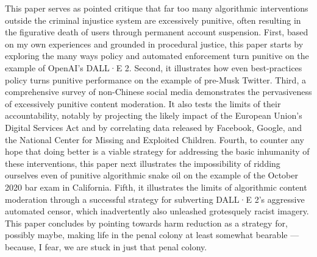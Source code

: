 This paper serves as pointed critique that far too many algorithmic interventions outside the criminal injustice system are excessively punitive, often resulting in the figurative death of users through permanent account suspension. First, based on my own experiences and grounded in procedural justice, this paper starts by exploring the many ways policy and automated enforcement turn punitive on the example of OpenAI's DALL·E 2. Second, it illustrates how even best-practices policy turns punitive performance on the example of pre-Musk Twitter. Third, a comprehensive survey of non-Chinese social media demonstrates the pervasiveness of excessively punitive content moderation. It also tests the limits of their accountability, notably by projecting the likely impact of the European Union's Digital Services Act and by correlating data released by Facebook, Google, and the National Center for Missing and Exploited Children. Fourth, to counter any hope that doing better is a viable strategy for addressing the basic inhumanity of these interventions, this paper next illustrates the impossibility of ridding ourselves even of punitive algorithmic snake oil on the example of the October 2020 bar exam in California. Fifth, it illustrates the limits of algorithmic content moderation through a successful strategy for subverting DALL·E 2's aggressive automated censor, which inadvertently also unleashed grotesquely racist imagery. This paper concludes by pointing towards harm reduction as a strategy for, possibly maybe, making life in the penal colony at least somewhat bearable --- because, I fear, we are stuck in just that penal colony.
